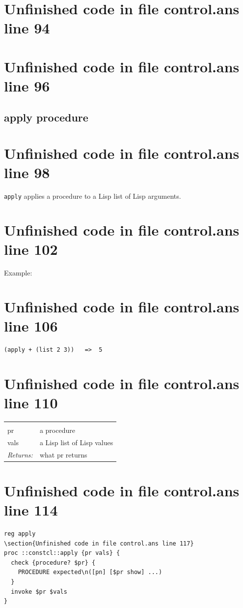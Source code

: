 \documentclass[twoside,9pt]{report}
\begin{document}
\section{Unfinished code in file control.ans line 94}
\section{Unfinished code in file control.ans line 96}
\subsection{apply procedure}
\label{apply-procedure}
\section{Unfinished code in file control.ans line 98}


\texttt{apply} applies a procedure to a Lisp list of Lisp arguments.

\section{Unfinished code in file control.ans line 102}


Example:

\section{Unfinished code in file control.ans line 106}
\begin{verbatim}
(apply + (list 2 3))   =>  5
\end{verbatim}
\section{Unfinished code in file control.ans line 110}
\noindent\begin{tabular}{ |p{1.9cm} p{8cm}| }
\hline
\rowcolor[HTML]{CCCCCC} \multicolumn{2}{|l|}{\bf apply (public)} \\
pr & a procedure \\
vals & a Lisp list of Lisp values \\
\textit{Returns:} & what pr returns \\
\hline
\end{tabular}
\section{Unfinished code in file control.ans line 114}
\begin{lstlisting}
reg apply
\section{Unfinished code in file control.ans line 117}
proc ::constcl::apply {pr vals} {
  check {procedure? $pr} {
    PROCEDURE expected\n([pn] [$pr show] ...)
  }
  invoke $pr $vals
}
\end{lstlisting}
\end{document}
